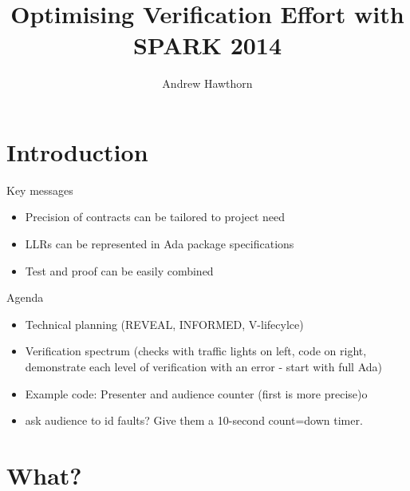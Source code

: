 \documentclass{beamer}
\title{Optimising Verification Effort with SPARK 2014}
\author{Andrew Hawthorn}
\begin{document}
\begin{altrantitle}
\end{altrantitle}


\section{Introduction}

\begin{frame}[fragile]{Key messages}
  \begin{itemize}
  \item Precision of contracts can be tailored to project need
  \item LLRs can be represented in Ada package specifications
  \item Test and proof can be easily combined

  \end{itemize}
\end{frame}

\begin{frame}[fragile]{Agenda}
  \begin{itemize}
     \item Technical planning (REVEAL, INFORMED, V-lifecylce)
     \item Verification spectrum (checks with traffic lights on left, code on right, demonstrate each level of verification with an error - start with full Ada)
     \item Example code: Presenter and audience counter (first is more precise)o
     \item ask audience to id faults? Give them a 10-second count=down timer.
  \end{itemize}
\end{frame}

\section{What?}
\end{document}
